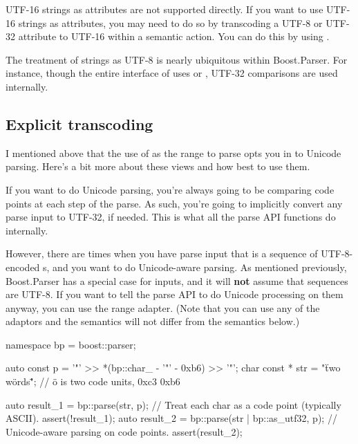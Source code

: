 \documentclass{MyBook}
\begin{document}
\begin{marker}[title=Note ]
UTF-16 strings as attributes are not supported directly. If you want to use UTF-16 strings as attributes, you may need to do so by transcoding a UTF-8 or UTF-32 attribute to UTF-16 within a semantic action. You can do this by using . 
\end{marker}

The treatment of strings as UTF-8 is nearly ubiquitous within Boost.Parser. For instance, though the entire interface of  uses  or , UTF-32 comparisons are used internally.

\subsection{Explicit transcoding}

I mentioned above that the use of  as the range to parse opts you in to Unicode parsing. Here's a bit more about these views and how best to use them.

If you want to do Unicode parsing, you're always going to be comparing code points at each step of the parse. As such, you're going to implicitly convert any parse input to UTF-32, if needed. This is what all the parse API functions do internally.

However, there are times when you have parse input that is a sequence of UTF-8-encoded s, and you want to do Unicode-aware parsing. As mentioned previously, Boost.Parser has a special case for  inputs, and it will \textbf{not} assume that  sequences are UTF-8. If you want to tell the parse API to do Unicode processing on them anyway, you can use the  range adapter. (Note that you can use any of the  adaptors and the semantics will not differ from the semantics below.)

\begin{code}
namespace bp = boost::parser;

auto const p = '"' >> *(bp::char_ - '"' - 0xb6) >> '"';
char const * str = "\"two wörds\""; // ö is two code units, 0xc3 0xb6

auto result_1 = bp::parse(str, p);                // Treat each char as a code point (typically ASCII).
assert(!result_1);
auto result_2 = bp::parse(str | bp::as_utf32, p); // Unicode-aware parsing on code points.
assert(result_2);
\end{code}
\end{document}
